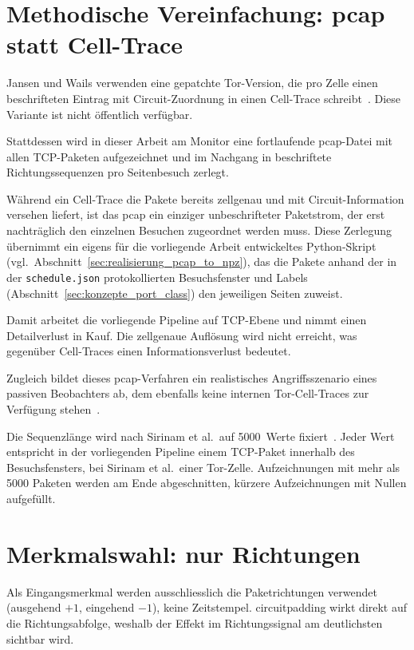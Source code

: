 \section{Methodische Vereinfachung: \gls{pcap} statt Cell-Trace}
\label{sec:konzepte_pcap}

Jansen und Wails verwenden eine gepatchte Tor-Version, die pro Zelle einen beschrifteten Eintrag mit Circuit-Zuordnung in einen Cell-Trace schreibt~\cite{jansen2023data}.
Diese Variante ist nicht öffentlich verfügbar.

Stattdessen wird in dieser Arbeit am Monitor eine fortlaufende \gls{pcap}-Datei mit allen TCP-Paketen aufgezeichnet und im Nachgang in beschriftete Richtungssequenzen pro Seitenbesuch zerlegt.

Während ein Cell-Trace die Pakete bereits zellgenau und mit Circuit-Information versehen liefert, ist das \gls{pcap} ein einziger unbeschrifteter Paketstrom, der erst nachträglich den einzelnen Besuchen zugeordnet werden muss.
Diese Zerlegung übernimmt ein eigens für die vorliegende Arbeit entwickeltes Python-Skript (vgl.\ Abschnitt~\ref{sec:realisierung_pcap_to_npz}), das die Pakete anhand der in der \texttt{schedule.json} protokollierten Besuchsfenster und Labels (Abschnitt~\ref{sec:konzepte_port_class}) den jeweiligen Seiten zuweist.

Damit arbeitet die vorliegende Pipeline auf TCP-Ebene und nimmt einen Detailverlust in Kauf.
Die zellgenaue Auflösung wird nicht erreicht, was gegenüber Cell-Traces einen Informationsverlust bedeutet.

Zugleich bildet dieses \gls{pcap}-Verfahren ein realistisches Angriffsszenario eines passiven Beobachters ab, dem ebenfalls keine internen Tor-Cell-Traces zur Verfügung stehen~\cite{wang2016realistically}.

Die Sequenzlänge wird nach Sirinam et al.\ auf 5000~Werte fixiert~\cite{sirinam2018deep}.
Jeder Wert entspricht in der vorliegenden Pipeline einem TCP-Paket innerhalb des Besuchsfensters, bei Sirinam et al.\ einer Tor-Zelle.
Aufzeichnungen mit mehr als 5000 Paketen werden am Ende abgeschnitten, kürzere Aufzeichnungen mit Nullen aufgefüllt.

\section{Merkmalswahl: nur Richtungen}
\label{sec:konzepte_features}

Als Eingangsmerkmal werden ausschliesslich die Paketrichtungen verwendet (ausgehend $+1$, eingehend $-1$), keine Zeitstempel.
\gls{circuitpadding} wirkt direkt auf die Richtungsabfolge, weshalb der Effekt im Richtungssignal am deutlichsten sichtbar wird.

